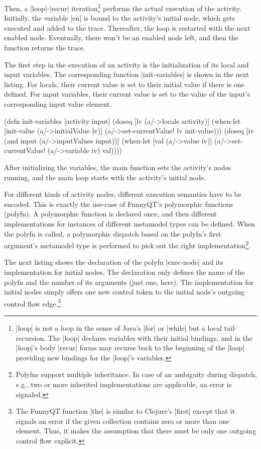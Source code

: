 \documentclass[submission]{eptcs}
\newcommand{\code}{\clojureinline}
\begin{document}
Then, a \code|loop|-\code|recur| iteration\footnote{\code|loop| is not a loop
  in the sense of Java's \code|for| or \code|while| but a local tail-recursion.
  The \code|loop| declares variables with their initial bindings, and in the
  \code|loop|'s body \code|recur| forms may recurse back to the beginning of
  the \code|loop| providing new bindings for the \code|loop|'s variables.}
performs the actual execution of the activity.  Initially, the variable
\code|en| is bound to the activity's initial node, which gets executed and
added to the trace.  Thereafter, the loop is restarted with the next enabled
node.  Eventually, there won't be an enabled node left, and then the function
returns the trace.

The first step in the execution of an activity is the initialization of its
local and input variables.  The corresponding function \code|init-variables| is
shown in the next listing.  For locals, their current value is set to their
initial value if there is one defined.  For input variables, their current
value is set to the value of the input's corresponding input value element.

\begin{clojurecode}
(defn init-variables [activity input]
  (doseq [lv (a/->locals activity)]
    (when-let [init-value (a/->initialValue lv)]
      (a/->set-currentValue! lv init-value)))
  (doseq [iv (and input (a/->inputValues input))]
    (when-let [val (a/->value iv)]
      (a/->set-currentValue! (a/->variable iv) val))))
\end{clojurecode}

After initializing the variables, the main function sets the activity's nodes
running, and the main loop starts with the activity's initial node.

For different kinds of activity nodes, different execution semantics have to be
encoded.  This is exactly the use-case of FunnyQT's polymorphic functions
(polyfn).  A polymorphic function is declared once, and then different
implementations for instances of different metamodel types can be defined.
When the polyfn is called, a polymorphic dispatch based on the polyfn's first
argument's metamodel type is performed to pick out the right
implementation\footnote{Polyfns support multiple inheritance.  In case of an
  ambiguity during dispatch, e.g., two or more inherited implementations are
  applicable, an error is signaled.}.

The next listing shows the declaration of the polyfn \code|exec-node| and its
implementation for initial nodes.  The declaration only defines the name of the
polyfn and the number of its arguments (just one, here).  The implementation
for initial nodes simply offers one new control token to the initial node's
outgoing control flow edge.\footnote{The FunnyQT function \code|the| is similar
  to Clojure's \code|first| except that it signals an error if the given
  collection contains zero or more than one element.  Thus, it makes the
  assumption that there must be only one outgoing control flow explicit.}
\end{document}
